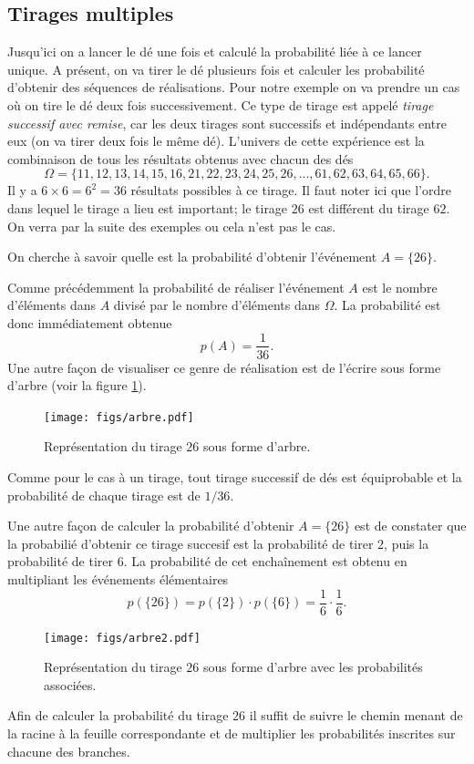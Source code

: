 \documentclass[a4paper,12pt]{book}
\begin{document}
\subsection{Tirages multiples}

Jusqu'ici on a lancer le dé une fois et calculé la probabilité liée à ce lancer unique. 
A présent, on va tirer le dé plusieurs fois et calculer les probabilité d'obtenir des séquences 
de réalisations. Pour notre exemple on va prendre un cas où on tire le dé deux fois successivement.
Ce type de tirage est appelé \textit{tirage successif avec remise}, car les deux tirages sont 
successifs et indépendants entre eux (on va tirer deux fois le même dé). L'univers de 
cette expérience est la combinaison de tous les résultats obtenus avec chacun des dés
\begin{equation}
 \Omega=\{11,12,13,14,15,16,21,22,23,24,25,26,...,61,62,63,64,65,66\}.
\end{equation}
Il y a $6\times 6=6^2=36$ résultats possibles à ce tirage. Il faut noter ici que l'ordre dans lequel le tirage 
a lieu est important; le tirage $26$ est différent du tirage $62$. On verra par la suite des exemples ou cela n'est pas le cas.

On cherche à savoir quelle est la probabilité d'obtenir l'événement $A=\{26\}$.

Comme précédemment la probabilité de réaliser l'événement $A$ est le nombre d'éléments dans $A$ divisé par le nombre d'éléments dans $\Omega$.
La probabilité est donc immédiatement obtenue
\begin{equation}
 p(A)=\frac{1}{36}.
\end{equation}
Une autre façon de visualiser ce genre de réalisation est de l'écrire sous forme d'arbre
(voir la figure \ref{fig_arbre}).
\begin{figure}[htp]
\texttt{[image: figs/arbre.pdf]}
\caption{Représentation du tirage $26$ sous forme d'arbre.}\label{fig_arbre}
\end{figure}
Comme pour le cas à un tirage, tout tirage successif de dés est équiprobable et la probabilité
de chaque tirage est de $1/36$.

Une autre façon de calculer la probabilité d'obtenir $A=\{26\}$ est de constater que la probabilié 
d'obtenir ce tirage succesif est la probabilité de tirer $2$, puis la probabilité de tirer $6$. La probabilité
de cet enchaînement est obtenu en multipliant les événements élémentaires
\begin{equation}
 p(\{26\})=p(\{2\})\cdot p(\{6\})=\frac{1}{6}\cdot\frac{1}{6}.
\end{equation}
\begin{figure}[htp]
\texttt{[image: figs/arbre2.pdf]}
\caption{Représentation du tirage $26$ sous forme d'arbre avec les probabilités associées.}\label{fig_arbre2}
\end{figure}
Afin de calculer la probabilité du tirage $26$ il suffit de suivre le chemin menant de la racine à la feuille correspondante
et de multiplier les probabilités inscrites sur chacune des branches.
\end{document}
